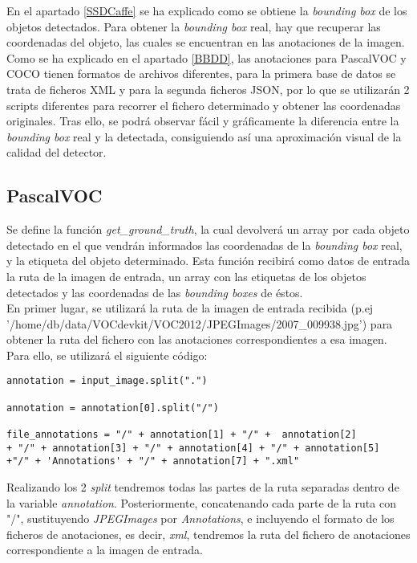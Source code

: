 \documentclass[a4paper, 12pt, oneside]{book}
\begin{document}
En el apartado \ref{SSDCaffe} se ha explicado como se obtiene la \textit{bounding box} de los objetos detectados. Para obtener la \textit{bounding box} real, hay que recuperar las coordenadas del objeto, las cuales se encuentran en las anotaciones de la imagen. Como se ha explicado en el apartado \ref{BBDD}, las anotaciones para PascalVOC y COCO tienen formatos de archivos diferentes, para la primera base de datos se trata de ficheros XML y para la segunda ficheros JSON, por lo que se utilizarán 2 scripts diferentes para recorrer el fichero determinado y obtener las coordenadas originales. Tras ello, se podrá observar fácil y gráficamente la diferencia entre la \textit{bounding box} real y la detectada, consiguiendo así una aproximación visual de la calidad del detector.

\subsection{PascalVOC}\label{ComparePascalVOC}

Se define la función \textit{get\_ground\_truth}, la cual devolverá un array por cada objeto detectado en el que vendrán informados las coordenadas de la \textit{bounding box} real, y la etiqueta del objeto determinado. Esta función recibirá como datos de entrada la ruta de la imagen de entrada, un array con las etiquetas de los objetos detectados y las coordenadas de las \textit{bounding boxes} de éstos.\\

En primer lugar, se utilizará la ruta de la imagen de entrada recibida (p.ej '/home/db/data/VOCdevkit/VOC2012/JPEGImages/2007\_009938.jpg') para obtener la ruta del fichero con las anotaciones correspondientes a esa imagen. Para ello, se utilizará el siguiente código:\\

\begin{lstlisting}[frame=single]
annotation = input_image.split(".")

annotation = annotation[0].split("/")

file_annotations = "/" + annotation[1] + "/" +  annotation[2] 
+ "/" + annotation[3] + "/" + annotation[4] + "/" + annotation[5] 
+"/" + 'Annotations' + "/" + annotation[7] + ".xml"
\end{lstlisting}

Realizando los 2 \textit{split} tendremos todas las partes de la ruta separadas dentro de la variable \textit{annotation}. Posteriormente, concatenando cada parte de la ruta con "/", sustituyendo \textit{JPEGImages} por \textit{Annotations}, e incluyendo el formato de los ficheros de anotaciones, es decir, \textit{xml}, tendremos la ruta del fichero de anotaciones correspondiente a la imagen de entrada.\\
\end{document}
